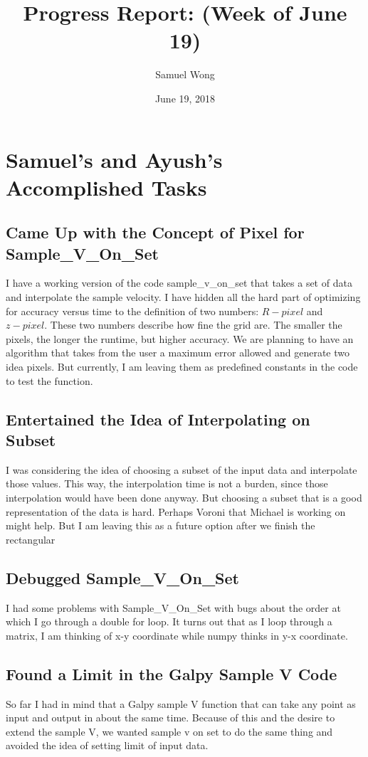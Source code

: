 \documentclass[12pt]{article}
\begin{document}
\title{Progress Report: (Week of June 19)}
\author{Samuel Wong}
\date{June 19, 2018}
\maketitle


\section{Samuel's and Ayush's Accomplished Tasks}
\subsection{Came Up with the Concept of Pixel for Sample\_V\_On\_Set}
I have a working version of the code sample\_v\_on\_set that takes a set of data and interpolate the sample velocity. I have hidden all the hard part of optimizing for accuracy versus time to the definition of two numbers: $R-pixel$ and $z-pixel$. These two numbers describe how fine the grid are. The smaller the pixels, the longer the runtime, but higher accuracy. We are planning to have an algorithm that takes from the user a maximum error allowed and generate two idea pixels. But currently, I am leaving them as predefined constants in the code to test the function.
\subsection{Entertained the Idea of Interpolating on Subset}
I was considering the idea of choosing a subset of the input data and interpolate those values. This way, the interpolation time is not a burden, since those interpolation would have been done anyway. But choosing a subset that is a good representation of the data is hard. Perhaps Voroni that Michael is working on might help. But I am leaving this as a future option after we finish the rectangular 
\subsection{Debugged Sample\_V\_On\_Set}
I had some problems with Sample\_V\_On\_Set with bugs about the order at which I go through a double for loop. It turns out that as I loop through a matrix, I am thinking of x-y coordinate while numpy thinks in y-x coordinate.
\subsection{Found a Limit in the Galpy Sample V Code}
So far I had in mind that a Galpy sample V function that can take any point as input and output in about the same time. Because of this and the desire to extend the sample V, we wanted sample v on set to do the same thing and avoided the idea of setting limit of input data.
\end{document}
